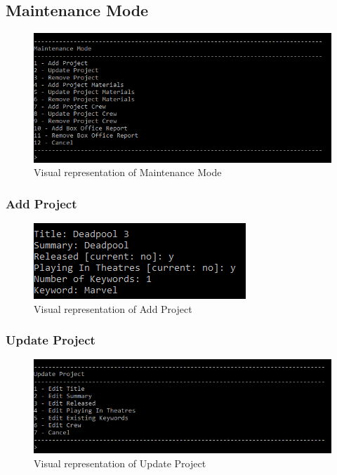 \documentclass[
  english,
  a4paper,
,tablecaptionabove
]{scrartcl}
\begin{document}
\newpage

\hypertarget{maintenance-mode}{%
\subsection{Maintenance Mode}\label{maintenance-mode}}

\begin{figure}
\centering
\includegraphics{images/ui-screenshots/maintenance-mode.png}
\caption{Visual representation of Maintenance Mode}
\end{figure}

\hypertarget{add-project}{%
\subsubsection{Add Project}\label{add-project}}

\begin{figure}
\centering
\includegraphics{images/ui-screenshots/add-project.png}
\caption{Visual representation of Add Project}
\end{figure}

\newpage

\hypertarget{update-project}{%
\subsubsection{Update Project}\label{update-project}}

\begin{figure}
\centering
\includegraphics{images/ui-screenshots/update-project.png}
\caption{Visual representation of Update Project}
\end{figure}
\end{document}
